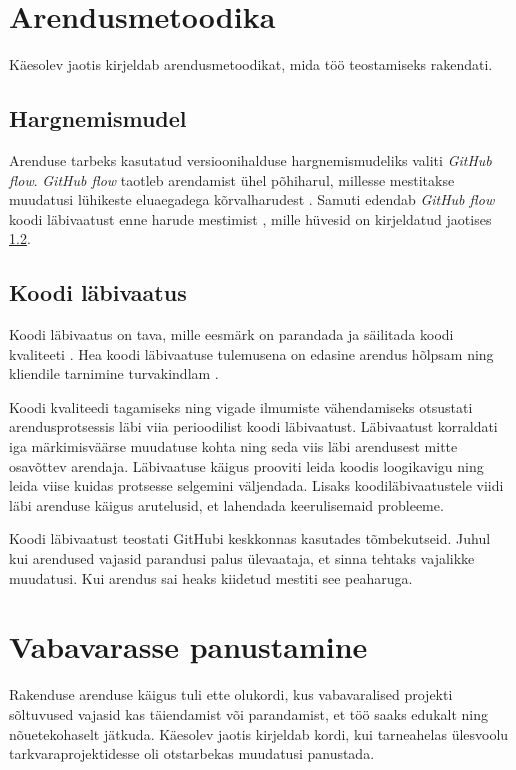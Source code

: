 \section{Arendusmetoodika}

Käesolev jaotis kirjeldab arendusmetoodikat, mida töö teostamiseks rakendati.

\subsection{Hargnemismudel}

Arenduse tarbeks kasutatud versioonihalduse hargnemismudeliks valiti \textit{GitHub flow}. \textit{GitHub flow} taotleb arendamist ühel põhiharul, millesse mestitakse muudatusi lühikeste eluaegadega kõrvalharudest \cite{github-flow}. Samuti edendab \textit{GitHub flow} koodi läbivaatust enne harude mestimist \cite{github-flow}, mille hüvesid on kirjeldatud jaotises \ref{subsec:code-review}.

\subsection{Koodi läbivaatus}\label{subsec:code-review}

Koodi läbivaatus on tava, mille eesmärk on parandada ja säilitada koodi kvaliteeti \cite{gitlab-code-review}. Hea koodi läbivaatuse tulemusena on edasine arendus hõlpsam ning kliendile tarnimine turvakindlam \cite{gitlab-code-review}.

Koodi kvaliteedi tagamiseks ning vigade ilmumiste vähendamiseks otsustati arendusprotsessis läbi viia perioodilist koodi läbivaatust. Läbivaatust korraldati iga märkimisväärse muudatuse kohta ning seda viis läbi arendusest mitte osavõttev arendaja. Läbivaatuse käigus prooviti leida koodis loogikavigu ning leida viise kuidas protsesse selgemini väljendada. Lisaks koodiläbivaatustele viidi läbi arenduse käigus arutelusid, et lahendada keerulisemaid probleeme.

Koodi läbivaatust teostati GitHubi keskkonnas kasutades tõmbekutseid. Juhul kui arendused vajasid parandusi palus ülevaataja, et sinna tehtaks vajalikke muudatusi. Kui arendus sai heaks kiidetud mestiti see peaharuga.
\clearpage

\section{Vabavarasse panustamine}

Rakenduse arenduse käigus tuli ette olukordi, kus vabavaralised projekti sõltuvused vajasid kas täiendamist või parandamist, et töö saaks edukalt ning nõuetekohaselt jätkuda. Käesolev jaotis kirjeldab kordi, kui tarneahelas ülesvoolu tarkvaraprojektidesse oli otstarbekas muudatusi panustada.

